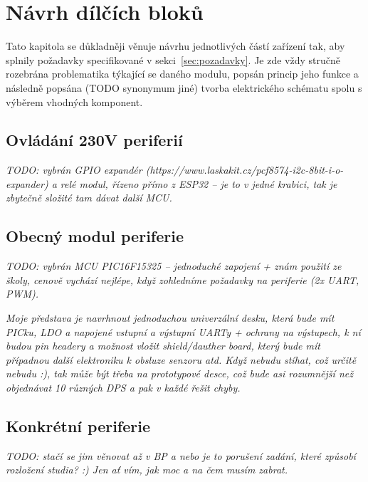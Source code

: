 \chapter{Návrh dílčích bloků}
\label{kap:navrh-dilnich-bloku}
    Tato kapitola se důkladněji věnuje návrhu jednotlivých částí zařízení tak, aby splnily požadavky specifikované v sekci~\ref{sec:pozadavky}. Je zde vždy stručně rozebrána problematika týkající se daného modulu, popsán princip jeho funkce a následně popsána (TODO synonymum jiné) tvorba elektrického schématu spolu s výběrem vhodných komponent.





\section{Ovládání 230V periferií}
    \textit{    TODO: vybrán GPIO expandér (https://www.laskakit.cz/pcf8574-i2c-8bit-i-o-expander) a relé modul, řízeno přímo z ESP32 -- je to v jedné krabici, tak je zbytečně složité tam dávat další MCU. } 
\section{Obecný modul periferie}
    \textit{    TODO: vybrán MCU PIC16F15325 -- jednoduché zapojení + znám použití ze školy, cenově vychází nejlépe, když zohledníme požadavky na periferie (2x UART, PWM). } 

    \textit{
        Moje představa je navrhnout jednoduchou univerzální desku, která bude mít PICku, LDO a napojené vstupní a výstupní UARTy + ochrany na výstupech, k ní budou pin headery a možnost vložit shield/dauther board, který bude mít případnou další elektroniku k obsluze senzoru atd. Když nebudu stíhat, což určitě nebudu :), tak může být třeba na prototypové desce, což bude asi rozumnější než objednávat 10 různých DPS a pak v každé řešit chyby.} 


    \section{Konkrétní periferie}
        \textit{TODO: stačí se jim věnovat až v BP a nebo je to porušení zadání, které způsobí rozložení studia? :) Jen ať vím, jak moc a na čem musím zabrat.} 



